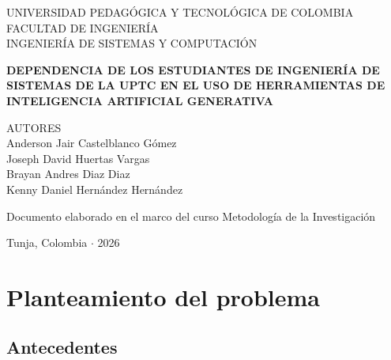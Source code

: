 \documentclass[12pt,letterpaper]{article}
\numberwithin{table}{section}
\numberwithin{figure}{section}
\begin{document}
\begin{titlepage}
\begin{center}
\vspace*{1cm}

{\MakeUppercase{Universidad Pedagógica y Tecnológica de Colombia}}\\[0.3cm]
{\MakeUppercase{Facultad de Ingeniería}}\\[0.3cm]
{\MakeUppercase{Ingeniería de Sistemas y Computación}}

\vfill

{\bfseries DEPENDENCIA DE LOS ESTUDIANTES DE INGENIERÍA DE SISTEMAS DE LA UPTC EN EL USO DE HERRAMIENTAS DE INTELIGENCIA ARTIFICIAL GENERATIVA}\\[0.5cm]

\vfill

{\MakeUppercase{Autores}}\\[0.3cm]
{Anderson Jair Castelblanco Gómez}\\
{Joseph David Huertas Vargas}\\
{Brayan Andres Diaz Diaz}\\
{Kenny Daniel Hernández Hernández}

\vfill

{\small Documento elaborado en el marco del curso Metodología de la Investigación}

\vfill

{Tunja, Colombia $\cdot$ 2026}

\end{center}
\end{titlepage}

\setcounter{page}{2}

\tableofcontents
\newpage

\listoftables
{}

\newpage

\listoffigures
{}

\newpage


\section{Planteamiento del problema}

\subsection{Antecedentes}
\end{document}
